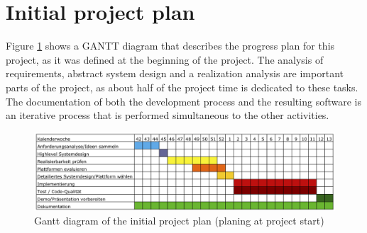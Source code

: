 \section{Initial project plan}
Figure \ref{gantt1} shows a GANTT diagram that describes the progress  plan for this project, as it was defined at the beginning of the project. The analysis of requirements, abstract system design and a realization analysis are important parts of the project, as about half of the project time is dedicated to these tasks. The documentation of both the development process and the resulting software is an iterative process that is performed simultaneous to the other activities.
\begin{figure}[h!]
\centering
\includegraphics[width=16cm]{pics/gantt2.png}
\caption{Gantt diagram of the initial project plan (planing at project start)}
\label{gantt1}
\end{figure}
